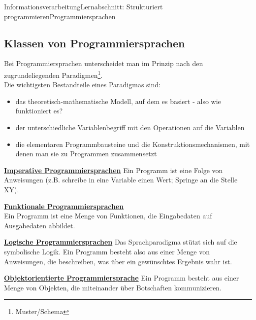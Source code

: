 \documentclass[11pt,oneside,openany,headings=optiontotoc,11pt,numbers=noenddot]{article}
\begin{document}
\begin{worksheet}{Informationsverarbeitung}{Lernabschnitt: Strukturiert programmieren}{Programmiersprachen}
		\subsection{Klassen von Programmiersprachen}
		Bei Programmiersprachen unterscheidet man im Prinzip nach den zugrundeliegenden Paradigmen\footnote{Muster/Schema}.\\
		Die wichtigsten Bestandteile eines Paradigmas sind:
		\begin{itemize}
			\item das theoretisch-mathematische Modell, auf dem es basiert - also wie funktioniert es?
			\item der unterschiedliche Variablenbegriff mit den Operationen auf die Variablen
			\item die elementaren Programmbausteine und die Konstruktionsmechanismen, mit denen man sie zu Programmen zusammensetzt
		\end{itemize}
		\textbf{\underline{Imperative Programmiersprachen}}
		Ein Programm ist eine Folge von Anweisungen (z.B. schreibe in eine Variable einen Wert; Springe an die Stelle XY).\\
		\par\noindent
		\textbf{\underline{Funktionale Programmiersprachen}}\\
		Ein Programm ist eine Menge von Funktionen, die Eingabedaten auf Ausgabedaten abbildet.\\
		\par\noindent
		\textbf{\underline{Logische Programmiersprachen}}
		Das Sprachparadigma stützt sich auf die symbolische Logik. Ein Programm besteht also aus einer Menge von Anweisungen, die beschreiben, was über ein gewünschtes Ergebnis wahr ist.\\
		\par\noindent
		\textbf{\underline{Objektorientierte Programmiersprache}}
		Ein Programm besteht aus einer Menge von Objekten, die miteinander über Botschaften kommunizieren.
	\end{worksheet}
\end{document}
